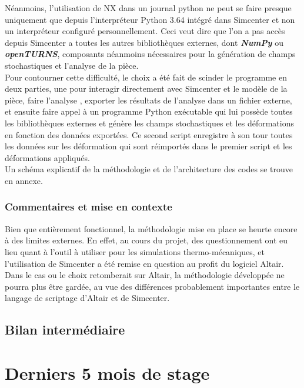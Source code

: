 \documentclass[a4paper,10pt]{article}
\begin{document}
Néanmoins, l'utilisation de NX dans un journal python ne peut se faire presque uniquement que depuis l’interpréteur Python 3.64 intégré dans Simcenter et non un interpréteur configuré personnellement. Ceci veut dire que l'on a pas accès depuis Simcenter a toutes les autres bibliothèques externes, dont \textit{\textbf{NumPy}} ou \textit{\textbf{openTURNS}}, composants néanmoins nécessaires pour la génération de champs stochastiques et l'analyse de la pièce. \\

Pour contourner cette difficulté, le choix a été fait de scinder le programme en deux parties, une pour interagir directement avec Simcenter et le modèle de la pièce, faire l'analyse , exporter les résultats de l'analyse dans un fichier externe, et ensuite faire appel à un programme Python exécutable qui lui possède toutes les bibliothèques externes et génère les champs stochastiques et les déformations en fonction des données exportées. Ce second script enregistre à son tour toutes les données sur les déformation qui sont réimportés dans le premier script et les déformations appliqués. \\

Un schéma explicatif de la méthodologie et de l'architecture des codes se trouve en annexe. \\

\subsubsection{Commentaires et mise en contexte}

Bien que entièrement fonctionnel, la méthodologie mise en place se heurte encore à des limites externes. En effet, au cours du projet, des questionnement ont eu lieu quant à l'outil à utiliser pour les simulations thermo-mécaniques, et l'utilisation de Simcenter a été remise en question au profit du logiciel Altair.\\ 
Dans le cas ou le choix retomberait sur Altair, la méthodologie développée ne pourra plus être gardée, au vue des différences probablement importantes entre le langage de scriptage d'Altair et de Simcenter.\\ 
 
\subsection{Bilan intermédiaire}



\section{Derniers 5 mois de stage }
\end{document}

